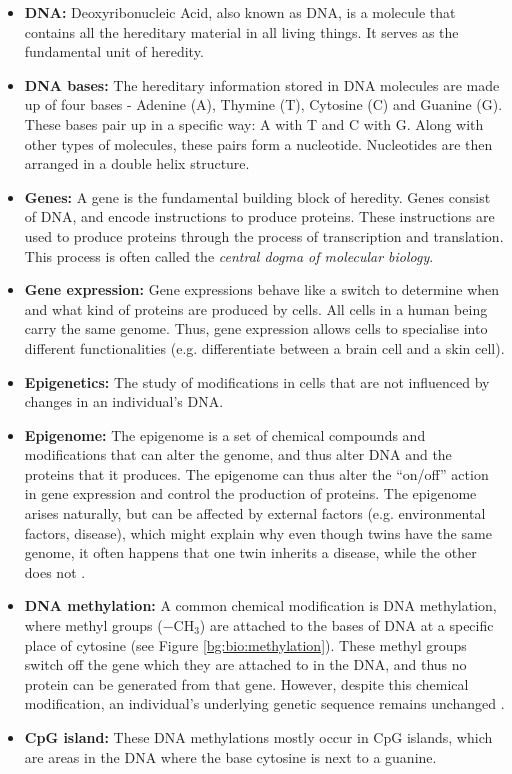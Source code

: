 \documentclass[12pt, twoside, a4paper]{report}
\begin{document}
\begin{itemize}
\item \textbf{DNA:} Deoxyribonucleic Acid, also known as DNA, is a molecule that contains all the hereditary material in all living things. It serves as the fundamental unit of heredity.

\item \textbf{DNA bases:} The hereditary information stored in DNA molecules are made up of four bases - Adenine (A), Thymine (T), Cytosine (C) and Guanine (G). These bases pair up in a specific way: A with T and C with G. Along with other types of molecules, these pairs form a nucleotide. Nucleotides are then arranged in a double helix structure.

\item \textbf{Genes:} A gene is the fundamental building block of heredity. Genes consist of DNA, and encode instructions to produce proteins. These instructions are used to produce proteins through the process of transcription and translation. This process is often called the \textit{central dogma of molecular biology}.

\item \textbf{Gene expression:} Gene expressions behave like a switch to determine when and what kind of proteins are produced by cells. All cells in a human being carry the same genome. Thus, gene expression allows cells to specialise into different functionalities (e.g. differentiate between a brain cell and a skin cell).

\item \textbf{Epigenetics:} The study of modifications in cells that are not influenced by changes in an individual's DNA.

\item \textbf{Epigenome:} The epigenome is a set of chemical compounds and modifications that can alter the genome, and thus alter DNA and the proteins that it produces. The epigenome can thus alter the ``on/off'' action in gene expression and control the production of proteins. The epigenome arises naturally, but can be affected by external factors (e.g. environmental factors, disease), which might explain why even though twins have the same genome, it often happens that one twin inherits a disease, while the other does not \cite{RefWorks:107}.

\item \textbf{DNA methylation:} A common chemical modification is DNA methylation, where methyl groups ($-$CH$_3$) are attached to the bases of DNA at a specific place of cytosine (see Figure \ref{bg:bio:methylation}). These methyl groups switch off the gene which they are attached to in the DNA, and thus no protein can be generated from that gene. However, despite this chemical modification, an individual's underlying genetic sequence remains unchanged \cite{RefWorks:249}.

\item \textbf{CpG island:} These DNA methylations mostly occur in CpG islands, which are areas in the DNA where the base cytosine is next to a guanine. 
\end{itemize}
\end{document}
